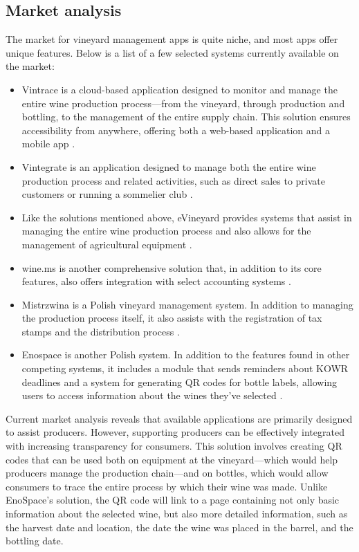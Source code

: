 \subsection{Market analysis}

The market for vineyard management apps is quite niche, and most apps offer unique features. Below is a list of a few selected systems currently available on the market:

\begin{itemize}
	\item Vintrace is a cloud-based application designed to monitor and manage the entire wine production process—from the vineyard, through production and bottling, to the management of the entire supply chain. This solution ensures accessibility from anywhere, offering both a web-based application and a mobile app
	\cite{vintrace}.
	\item Vintegrate is an application designed to manage both the entire wine production process and related activities, such as direct sales to private customers or running a sommelier club
	\cite{vintegrate}.
	\item Like the solutions mentioned above, eVineyard provides systems that assist in managing the entire wine production process and also allows for the management of agricultural equipment
	\cite{evineyard}.
	\item wine.ms is another comprehensive solution that, in addition to its core features, also offers integration with select accounting systems
	\cite{wine.ms}.
	\item Mistrzwina is a Polish vineyard management system. In addition to managing the production process itself, it also assists with the registration of tax stamps and the distribution process
	\cite{mistrzwina}.
	\item Enospace is another Polish system. In addition to the features found in other competing systems, it includes a module that sends reminders about KOWR deadlines and a system for generating QR codes for bottle labels, allowing users to access information about the wines they’ve selected
	\cite{enospace}.
\end{itemize}

Current market analysis reveals that available applications are primarily designed to assist producers. However, supporting producers can be effectively integrated with increasing transparency for consumers. This solution involves creating QR codes that can be used both on equipment at the vineyard—which would help producers manage the production chain—and on bottles, which would allow consumers to trace the entire process by which their wine was made. Unlike EnoSpace’s solution, the QR code will link to a page containing not only basic information about the selected wine, but also more detailed information, such as the harvest date and location, the date the wine was placed in the barrel, and the bottling date.